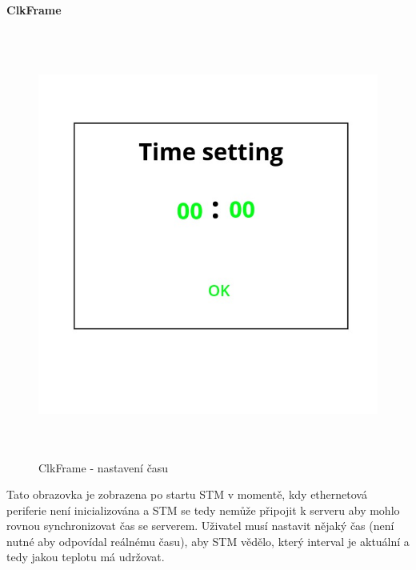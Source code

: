 \paragraph{ClkFrame}
\begin{figure}[H]\centering
\includegraphics[width=140mm, height=140mm]{../img/clk_frame.jpg}
\caption{ClkFrame - nastavení času}
\label{clk-frame}
\end{figure}

Tato obrazovka je zobrazena po startu STM v momentě, kdy ethernetová periferie není inicializována a
STM se tedy nemůže připojit k serveru aby mohlo rovnou synchronizovat čas se serverem.
Uživatel musí nastavit nějaký čas (není nutné aby odpovídal reálnému času), aby STM vědělo, který
interval je aktuální a tedy jakou teplotu má udržovat.

